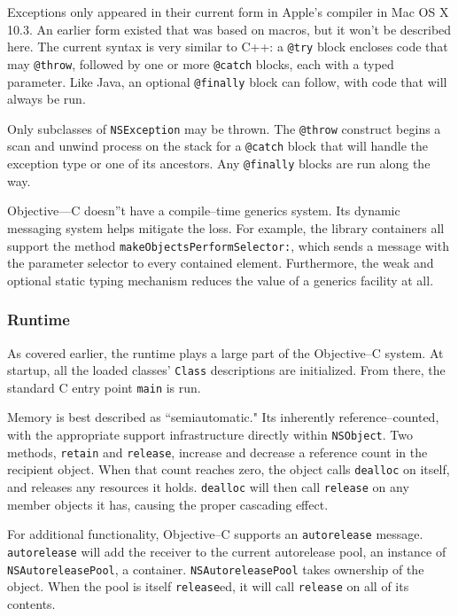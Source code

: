 Exceptions only appeared in their current form in Apple's compiler in Mac OS X
10.3. An earlier form existed that was based on macros, but it won't be
described here. The current syntax is very similar to C++: a \texttt{@try}
block encloses code that may \texttt{@throw}, followed by one or more
\texttt{@catch} blocks, each with a typed parameter. Like Java, an optional
\texttt{@finally} block can follow, with code that will always be run.

Only subclasses of \texttt{NSException} may be thrown. The \texttt{@throw}
construct begins a scan and unwind process on the stack for a \texttt{@catch}
block that will handle the exception type or one of its ancestors. Any
\texttt{@finally} blocks are run along the way.

Objective---C doesn''t have a compile--time generics system. Its dynamic
messaging system helps mitigate the loss. For example, the library containers
all support the method \texttt{makeObjectsPerformSelector:}, which sends a
message with the parameter selector to every contained element. Furthermore,
the weak and optional static typing mechanism reduces the value of a generics
facility at all.

\subsubsection{Runtime}

As covered earlier, the runtime plays a large part of the Objective--C system.
At startup, all the loaded classes' \texttt{Class} descriptions are
initialized. From there, the standard C entry point \texttt{main} is run.

Memory is best described as ``semiautomatic." Its inherently
reference--counted, with the appropriate support infrastructure directly
within \texttt{NSObject}. Two methods, \texttt{retain} and \texttt{release},
increase and decrease a reference count in the recipient object. When that
count reaches zero, the object calls \texttt{dealloc} on itself, and releases
any resources it holds. \texttt{dealloc} will then call \texttt{release} on
any member objects it has, causing the proper cascading effect.

For additional functionality, Objective--C supports an
\texttt{aut\-or\-el\-ease} message. \texttt{autorelease} will add the receiver
to the current autorelease pool, an instance of \texttt{NSAutoreleasePool}, a
container. \texttt{NSAutoreleasePool} takes ownership of the object. When the
pool is itself \texttt{release}ed, it will call \texttt{release} on all of its
contents.


